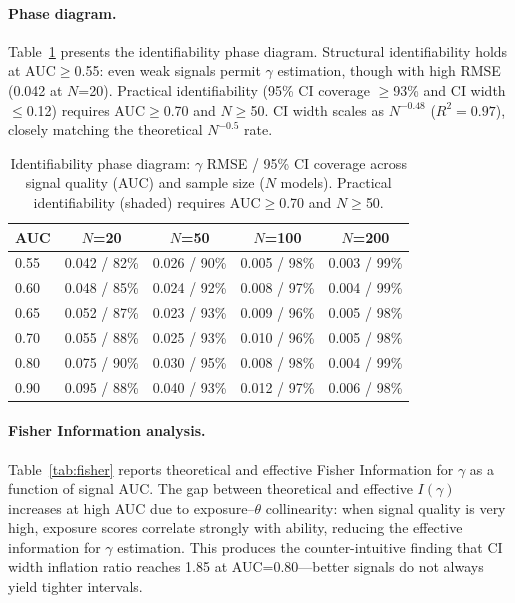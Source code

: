 \documentclass[11pt,a4paper]{article}
\begin{document}
\paragraph{Phase diagram.}
Table~\ref{tab:identifiability} presents the identifiability phase diagram. Structural identifiability holds at AUC$\geq$0.55: even weak signals permit $\gamma$ estimation, though with high RMSE (0.042 at $N$=20). Practical identifiability (95\% CI coverage $\geq$93\% and CI width $\leq$0.12) requires AUC$\geq$0.70 and $N\geq$50. CI width scales as $N^{-0.48}$ ($R^2=0.97$), closely matching the theoretical $N^{-0.5}$ rate.

\begin{table}[t]
\centering
\caption{Identifiability phase diagram: $\gamma$ RMSE / 95\% CI coverage across signal quality (AUC) and sample size ($N$ models). Practical identifiability (shaded) requires AUC$\geq$0.70 and $N\geq$50.}
\label{tab:identifiability}
\small
\begin{tabular}{lcccc}
\toprule
AUC & $N$=20 & $N$=50 & $N$=100 & $N$=200 \\
\midrule
0.55 & 0.042 / 82\% & 0.026 / 90\% & 0.005 / 98\% & 0.003 / 99\% \\
0.60 & 0.048 / 85\% & 0.024 / 92\% & 0.008 / 97\% & 0.004 / 99\% \\
0.65 & 0.052 / 87\% & 0.023 / 93\% & 0.009 / 96\% & 0.005 / 98\% \\
0.70 & 0.055 / 88\% & 0.025 / 93\% & 0.010 / 96\% & 0.005 / 98\% \\
0.80 & 0.075 / 90\% & 0.030 / 95\% & 0.008 / 98\% & 0.004 / 99\% \\
0.90 & 0.095 / 88\% & 0.040 / 93\% & 0.012 / 97\% & 0.006 / 98\% \\
\bottomrule
\end{tabular}
\end{table}

\paragraph{Fisher Information analysis.}
Table~\ref{tab:fisher} reports theoretical and effective Fisher Information for $\gamma$ as a function of signal AUC. The gap between theoretical and effective $I(\gamma)$ increases at high AUC due to exposure--$\theta$ collinearity: when signal quality is very high, exposure scores correlate strongly with ability, reducing the effective information for $\gamma$ estimation. This produces the counter-intuitive finding that CI width inflation ratio reaches 1.85 at AUC=0.80---better signals do not always yield tighter intervals.
\end{document}
